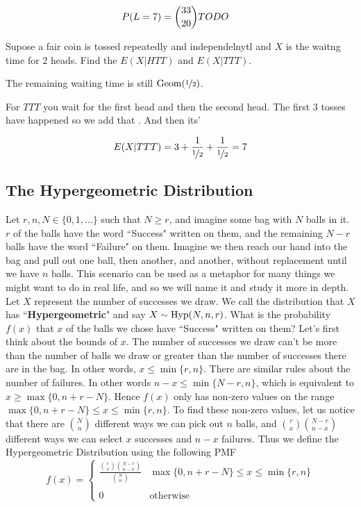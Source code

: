 \[
    P(L=7)=\binom{33}{20}TODO\quad
\]

\begin{example}
    Supose a fair coin is tossed repeatedly and independelnytl and $X$ is the waitng time for 2 heads. Find the $E(X|HTT)$ and $E(X|TTT)$.

    The remaining waiting time is still $\text{Geom}(\nicefrac 12)$. 

    For $TTT$ you wait for the first head and then the second head. The first 3 tosses have happened so we add that . And then its'

    \[
        E(X|TTT)=3+\frac{1}{\nicefrac 12}+\frac{1}{\nicefrac 12}=7
    \]
    \todo
        
\end{example}

\subsection{The Hypergeometric Distribution}
\newcommand{\hyp}{\textup{Hyp}}
Let $r,n,N\in \{0,1,...\}$ such that $N\ge r$, and imagine some bag with $N$ balls in it. $r$ of the balls have the word ``Success" written on them, and the remaining $N-r$ balls have the word ``Failure" on them. Imagine we then reach our hand into the bag and pull out one ball, then another, and another, without replacement until we have $n$ balls. This scenario can be used as a metaphor for many things we might want to do in real life, and so we will name it and study it more in depth. Let $X$ represent the number of successes we draw. We call the distribution that $X$ has ``\textbf{Hypergeometric}" and say $X\sim \hyp(N,n,r)$. What is the probability $f(x)$ that $x$ of the balls we chose have ``Success" written on them? Let's first think about the bounds of $x$. The number of successes we draw can't be more than the number of balls we draw or greater than the number of successes there are in the bag. In other words, $x\le \min\{r,n\}$. There are similar rules about the number of failures. In other words $n-x\le \min\{N-r, n\}$, which is equivalent to $x\ge \max\{0, n+r-N\}$. Hence $f(x)$ only has non-zero values on the range $\max\{0, n+r-N\}\le x \le \min\{r,n\}$. To find these non-zero values, let us notice that there are $\binom Nn$ different ways we can pick out $n$ balls, and $\binom r x \binom {N-r}{n-x}$ different ways we can select $x$ successes and $n-x$ failures. Thus we define the Hypergeometric Distribution using the following PMF
\[
    f(x)=\begin{cases}
        \displaystyle\frac{\binom r x \binom {N-r}{n-x}}{\binom Nn} & \max\{0, n+r-N\}\le x \le \min\{r,n\} \\\\
        0 & \text{otherwise}
    \end{cases}
\]
